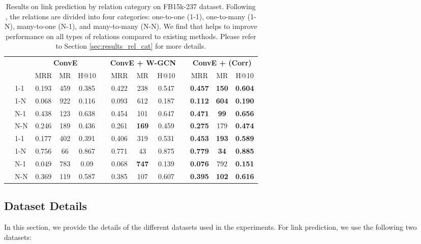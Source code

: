 \documentclass{article} \usepackage{iclr2020_conference,times}
\begin{document}
\begin{table*}[!h]
	\centering
	\small
	\begin{tabular}{lm{3em}ccccccccccc}
		\toprule
		
		{} &  {} & \multicolumn{3}{c}{\textbf{ConvE}} && \multicolumn{3}{c}{\textbf{ConvE + W-GCN}} && \multicolumn{3}{c}{\textbf{ConvE + \method{} (Corr)}} \\
		\cmidrule(r){3-5}  \cmidrule(r){7-9} \cmidrule(r){11-13}
		{} & &   MRR & MR   & H@10  &&  MRR & MR   & H@10  &&  MRR & MR   & H@10   \\
		\midrule
		\multirow{4}{*}{\rotatebox[origin=c]{90}{Head Pred}} & 1-1 & 0.193	& 459	& 0.385	&& 0.422	& 238	& 0.547	&& \textbf{0.457	}& \textbf{150}	& \textbf{0.604} \\
		& 1-N & 0.068	& 922	& 0.116	&& 0.093	& 612	& 0.187	&& \textbf{0.112}	& \textbf{604}	& \textbf{0.190} \\
		& N-1 & 0.438	& 123	& 0.638	&& 0.454	& 101	& 0.647	&& \textbf{0.471}	& \textbf{99}	& \textbf{0.656} \\
		& N-N & 0.246	& 189	& 0.436	&& 0.261	& \textbf{169}	& 0.459	&& \textbf{0.275} & 179	& \textbf{0.474} \\
		\midrule
		\multirow{4}{*}{\rotatebox[origin=c]{90}{Tail Pred}} & 1-1 & 0.177	& 402	& 0.391	&& 0.406	& 319	& 0.531	&& \textbf{0.453}	& \textbf{193}	& \textbf{0.589} \\
		& 1-N & 0.756	& 66	& 0.867	&& 0.771	& 43	& 0.875	&& \textbf{0.779}	& \textbf{34}	& \textbf{0.885} \\
		& N-1 & 0.049	& 783	& 0.09	&& 0.068	& \textbf{747}	& 0.139	&& \textbf{0.076}	& 792	& \textbf{0.151} \\
		& N-N & 0.369	& 119	& 0.587	&& 0.385	& 107	& 0.607	&& \textbf{0.395	}& \textbf{102}	& \textbf{0.616} \\
		\bottomrule
	\end{tabular}
	\caption{\label{tbl:results_rel_cat}Results on link prediction by relation category on FB15k-237 dataset. Following \cite{kg_relation_cat}, the relations are divided into four categories: one-to-one (1-1), one-to-many (1-N), many-to-one (N-1), and many-to-many (N-N). We find that \method{} helps to improve performance on all types of relations compared to existing methods. Please refer to Section \ref{sec:results_rel_cat} for more details.}
\end{table*}

\subsection{Dataset Details}
\label{sec:dataset_stats}
In this section, we provide the details of the different datasets used in the experiments. For link prediction, we use the following two datasets: 
\end{document}
